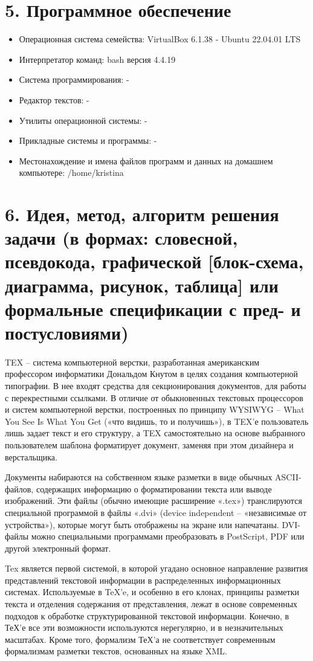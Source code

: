 \documentclass[a4paper]{report} %
\begin{document}
\section*{5. Программное обеспечение}
\begin{itemize}
    \item Операционная система семейства: VirtualBox 6.1.38 - Ubuntu 22.04.01 LTS
    \item Интерпретатор команд: bash версия 4.4.19
    \item Система программирования: -
    \item Редактор текстов: -
    \item Утилиты операционной системы: -
    \item Прикладные системы и программы: -
    \item Местонахождение и имена файлов программ и данных на домашнем компьютере: /home/kristina
\end{itemize}

\section*{6. Идея, метод, алгоритм решения задачи (в формах: словесной, псевдокода, графической [блок-схема, диаграмма, рисунок, таблица] или формальные спецификации с пред- и постусловиями)}
\paragraph{}
TEX – система компьютерной верстки, разработанная американским профессором информатики Дональдом Кнутом в целях создания компьютерной
типографии. В нее входят средства для секционирования документов, для
работы с перекрестными ссылками.
В отличие от обыкновенных текстовых процессоров и систем компьютерной верстки, построенных по принципу WYSIWYG – What You See Is
What You Get («что видишь, то и получишь»), в TEX’е пользователь лишь
задает текст и его структуру, а TEX самостоятельно на основе выбранного
пользователем шаблона форматирует документ, заменяя при этом дизайнера
и верстальщика.
\par
Документы набираются на собственном языке разметки в виде обычных
ASCII-файлов, содержащих информацию о форматировании текста или выводе изображений. Эти файлы (обычно имеющие расширение «.tex») транслируются специальной программой в файлы «.dvi» (device independent – «независимые от устройства»), которые могут быть отображены на экране или напечатаны. DVI-файлы можно специальными программами преобразовать в PostScript, PDF или другой электронный формат.
\par
Tex является первой системой, в которой угадано основное направление развития представлений текстовой информации в распределенных информационных системах. Используемые в TeX'e, и особенно в его клонах, принципы разметки текста и отделения содержания от представления, лежат в основе современных подходов к обработке структурированной текстовой информации. Конечно, в ТеХ'е все эти возможности используются нерегулярно, и в незначительных масштабах. Кроме того, формализм ТеХ'а не соответствует современным формализмам разметки текстов, основанных на языке XML.
\end{document}
